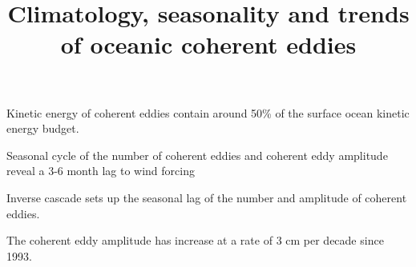 \documentclass[draft,linenumbers]{agujournal2019}
\begin{document}
\title{Climatology, seasonality and trends of oceanic coherent eddies}



\begin{keypoints}
	\item Kinetic energy of coherent eddies 
	contain around 50\% of the 
	surface ocean kinetic energy budget.
	\item Seasonal cycle of the number of coherent eddies and 
	coherent eddy amplitude reveal a 3-6 month lag to wind forcing
	\item Inverse cascade sets up the seasonal lag of the number and amplitude of coherent eddies.
	\item The coherent eddy amplitude has increase at 
	a rate of 3 cm per decade since 1993.
\end{keypoints}
\end{document}
